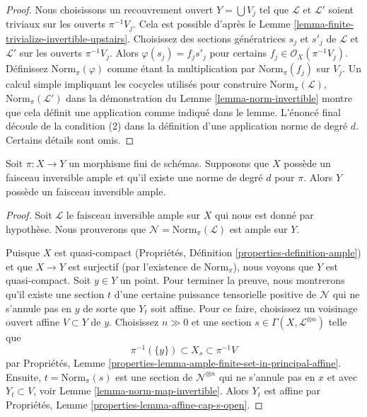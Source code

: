 \begin{proof}
Nous choisissons un recouvrement ouvert  $Y = \bigcup V_j$  tel que  $\mathcal{L}$  et
 $\mathcal{L}'$  soient triviaux sur les ouverts  $\pi^{-1}V_j$. Cela est possible
d'après le Lemme  \ref{lemma-finite-trivialize-invertible-upstairs}. Choisissez des sections génératrices  $s_j$ 
et  $s'_j$  de  $\mathcal{L}$  et  $\mathcal{L}'$  sur les ouverts  $\pi^{-1}V_j$.
Alors  $\varphi(s_j) = f_js'_j$  pour certains  $f_j \in \mathcal{O}_X(\pi^{-1}V_j)$. Définissez  $\text{Norm}_\pi(\varphi)$  comme étant
la multiplication par  $\text{Norm}_\pi(f_j)$  sur  $V_j$. Un calcul simple impliquant
les cocycles utilisés pour construire  $\text{Norm}_\pi(\mathcal{L})$,  $\text{Norm}_\pi(\mathcal{L}')$  dans la
démonstration du Lemme  \ref{lemma-norm-invertible}  montre que cela définit une application comme
indiqué dans le lemme. L'énoncé final découle de la condition (2) dans la
définition d'une application norme de degré  $d$. Certains détails sont
omis.
\end{proof}

\begin{lemma}
\label{lemma-norm-ample}
Soit  $\pi : X \to Y$  un morphisme fini de schémas. Supposons que  $X$  possède
un faisceau inversible ample et qu'il existe une norme de degré  $d$  pour
 $\pi$. Alors  $Y$  possède un faisceau inversible ample.
\end{lemma}

\begin{proof}
Soit  $\mathcal{L}$  le faisceau inversible ample sur  $X$  qui nous est donné
par hypothèse. Nous prouverons que  $\mathcal{N} = \text{Norm}_\pi(\mathcal{L})$  est ample sur  $Y$.

\medskip\noindent
Puisque  $X$  est quasi-compact (Propriétés, Définition  \ref{properties-definition-ample}) et
que  $X \to Y$  est surjectif (par l'existence de  $\text{Norm}_\pi$), nous voyons que
 $Y$  est quasi-compact. Soit  $y \in Y$  un point. Pour terminer la
preuve, nous montrerons qu'il existe une section  $t$  d'une certaine
puissance tensorielle positive de  $\mathcal{N}$  qui ne s'annule pas en  $y$ 
de sorte que  $Y_t$  soit affine. Pour ce faire, choisissez un voisinage
ouvert affine  $V \subset Y$  de  $y$. Choisissez  $n \gg 0$  et une section
 $s \in \Gamma(X, \mathcal{L}^{\otimes n})$  telle que
$$
\pi^{-1}(\{y\}) \subset X_s \subset \pi^{-1}V
$$
par Propriétés, Lemme  \ref{properties-lemma-ample-finite-set-in-principal-affine}. Ensuite,  $t = \text{Norm}_\pi(s)$  est une section de
 $\mathcal{N}^{\otimes n}$  qui ne s'annule pas en  $x$  et avec  $Y_t \subset V$, voir Lemme
 \ref{lemma-norm-map-invertible}. Alors  $Y_t$  est affine par Propriétés, Lemme  \ref{properties-lemma-affine-cap-s-open}.
\end{proof}


